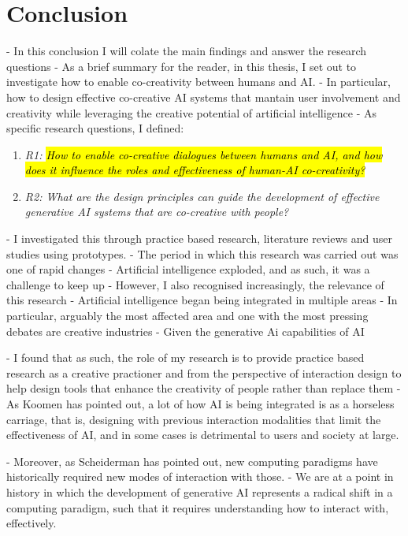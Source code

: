\chapter{Conclusion}\label{c:conclusion}

- In this conclusion I will colate the main findings and answer the research questions
- As a brief summary for the reader, in this thesis, I set out to investigate how to enable co-creativity between humans and AI. 
- In particular, how to design effective co-creative AI systems that mantain user involvement and creativity while leveraging the creative potential of artificial intelligence
- As specific research questions, I defined: 

\begin{enumerate}
    \item \textit{R1: \hl{How to enable co-creative dialogues between humans and AI, and how does it influence the roles and effectiveness of human-AI co-creativity?}}
    \item \textit{R2: What are the design principles can guide the development of effective generative AI systems that are co-creative with people?}
\end{enumerate}

- I investigated this through practice based research, literature reviews and user studies using prototypes. 
- The period in which this research was carried out was one of rapid changes
- Artificial intelligence exploded, and as such, it was a challenge to keep up
- However, I also recognised increasingly, the relevance of this research
- Artificial intelligence began being integrated in multiple areas
- In particular, arguably the most affected area and one with the most pressing debates are creative industries
- Given the generative Ai capabilities of AI

- I found that as such, the role of my research is to provide practice based research as a creative practioner and from the perspective of interaction design to help design tools that enhance the creativity of people rather than replace them
- As Koomen has pointed out, a lot of how AI is being integrated is as a horseless carriage, that is, designing with previous interaction modalities that limit the effectiveness of AI, and in some cases is detrimental to users and society at large. 

- Moreover, as Scheiderman has pointed out, new computing paradigms have historically required new modes of interaction with those. 
- We are at a point in history in which the development of generative AI represents a radical shift in a computing paradigm, such that it requires understanding how to interact with, effectively. 

